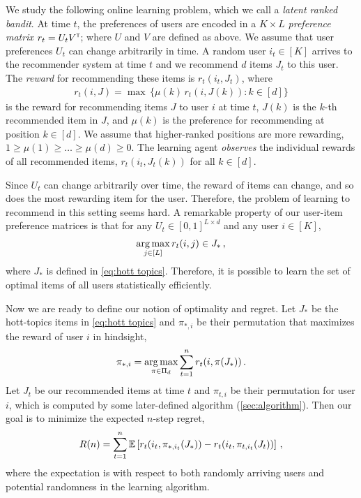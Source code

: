 
We study the following online learning problem, which we call a \emph{latent ranked bandit}. At time $t$, the preferences of users are encoded in a $K \times L$ \emph{preference matrix} $r_t = U_t V^\mathsf{\scriptscriptstyle T}$; where $U$ and $V$ are defined as above. We assume that user preferences $U_t$ can change arbitrarily in time. A random user $i_t \in [K]$ arrives to the recommender system at time $t$ and we recommend $d$ items $J_t$ to this user. The \emph{reward} for recommending these items is $r_t(i_t, J_t)$, where
\begin{align}
  r_t(i, J) =
  \max \, \{\mu(k) \, r_t(i, J(k)): k \in [d]\}
  \label{eq:reward}
\end{align}
is the reward for recommending items $J$ to user $i$ at time $t$, $J(k)$ is the $k$-th recommended item in $J$, and $\mu(k)$ is the preference for recommending at position $k \in [d]$. We assume that higher-ranked positions are more rewarding, $1 \geq \mu(1) \geq \dots \geq \mu(d) \geq 0$. The learning agent \emph{observes} the individual rewards of all recommended items, $r_t(i_t, J_t(k))$ for all $k \in [d]$. 

Since $U_t$ can change arbitrarily over time, the reward of items can change, and so does the most rewarding item for the user. Therefore, the problem of learning to recommend in this setting seems hard. A remarkable property of our user-item preference matrices is that for any $U_t \in [0, 1]^{L \times d}$ and any user $i \in [K]$,
\begin{align*}
  \mathop{\rm arg\,max}_{j \in [L]} r_t(i, j) \in J_\ast\,,
\end{align*}
where $J_\ast$ is defined in \eqref{eq:hott topics}. Therefore, it is possible to learn the set of optimal items of all users statistically efficiently.

Now we are ready to define our notion of optimality and regret. Let $J_\ast$ be the hott-topics items in \eqref{eq:hott topics} and $\pi_{\ast, i}$ be their permutation that maximizes the reward of user $i$ in hindsight,
\begin{align*}
  \pi_{\ast, i} =
  \mathop{\rm arg\,max}_{\pi \in \Pi_d} \sum_{t = 1}^n r_t(i, \pi(J_\ast))\,.
\end{align*}
Let $J_t$ be our recommended items at time $t$ and $\pi_{t, i}$ be their permutation for user $i$, which is computed by some later-defined algorithm (\cref{sec:algorithm}). Then our goal is to minimize the expected $n$-step regret,
\begin{align}
  R(n) =
  \sum_{t = 1}^n \mathbb{E}\left[r_t(i_t, \pi_{\ast, i_t}(J_\ast)) - r_t(i_t, \pi_{t, i_t}(J_t))\right]\,,
  \label{eq:regret}
\end{align}
where the expectation is with respect to both randomly arriving users and potential randomness in the learning algorithm.

